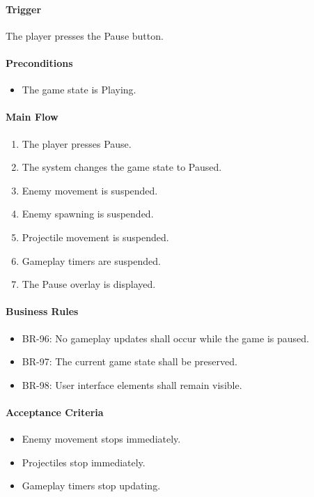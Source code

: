 \documentclass[11pt,a4paper]{article}
\begin{document}
\paragraph{Trigger}
The player presses the Pause button.

\paragraph{Preconditions}
\begin{itemize}
  \item The game state is Playing.
\end{itemize}

\paragraph{Main Flow}
\begin{enumerate}
  \item The player presses Pause.
  \item The system changes the game state to Paused.
  \item Enemy movement is suspended.
  \item Enemy spawning is suspended.
  \item Projectile movement is suspended.
  \item Gameplay timers are suspended.
  \item The Pause overlay is displayed.
\end{enumerate}

\paragraph{Business Rules}
\begin{itemize}
  \item BR-96: No gameplay updates shall occur while the game is paused.
  \item BR-97: The current game state shall be preserved.
  \item BR-98: User interface elements shall remain visible.
\end{itemize}

\paragraph{Acceptance Criteria}
\begin{itemize}
  \item Enemy movement stops immediately.
  \item Projectiles stop immediately.
  \item Gameplay timers stop updating.
\end{itemize}
\end{document}
